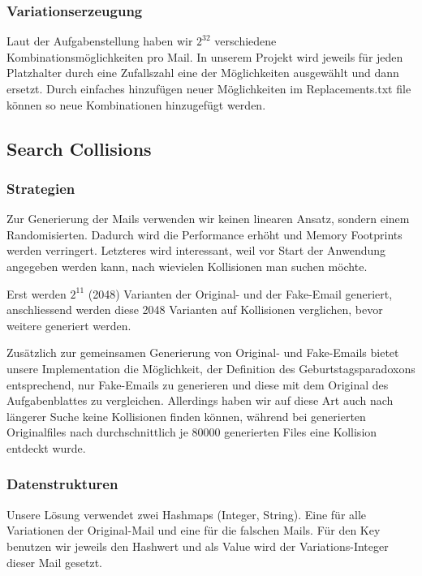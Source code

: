 \documentclass[12pt]{scrartcl}
\begin{document}
\subsubsection{Variationserzeugung}
Laut der Aufgabenstellung haben wir $2^{32}$ verschiedene Kombinationsmöglichkeiten pro Mail. In unserem Projekt wird jeweils für jeden Platzhalter durch eine Zufallszahl eine der Möglichkeiten ausgewählt und dann ersetzt. Durch einfaches hinzufügen neuer Möglichkeiten im Replacements.txt file können so neue Kombinationen hinzugefügt werden.

\subsection{Search Collisions}
\subsubsection{Strategien}
Zur Generierung der Mails verwenden wir keinen linearen Ansatz, sondern einem Randomisierten. Dadurch wird die Performance erhöht und Memory Footprints werden verringert. Letzteres wird interessant, weil vor Start der Anwendung angegeben werden kann, nach wievielen Kollisionen man suchen möchte.

Erst werden $2^{11}$ (2048) Varianten der Original- und der Fake-Email generiert, anschliessend werden diese 2048 Varianten auf Kollisionen verglichen, bevor weitere generiert werden.

Zusätzlich zur gemeinsamen Generierung von Original- und Fake-Emails bietet unsere Implementation die Möglichkeit, der Definition des Geburtstagsparadoxons entsprechend, nur Fake-Emails zu generieren und diese mit dem Original des Aufgabenblattes zu vergleichen. Allerdings haben wir auf diese Art auch nach längerer Suche keine Kollisionen finden können, während bei generierten Originalfiles nach durchschnittlich je 80000 generierten Files eine Kollision entdeckt wurde.

\subsubsection{Datenstrukturen}
Unsere Lösung verwendet zwei Hashmaps (Integer, String). Eine für alle Variationen der Original-Mail und eine für die falschen Mails. Für den Key benutzen wir jeweils den Hashwert und als Value wird der Variations-Integer dieser Mail gesetzt.
 
\end{document}
